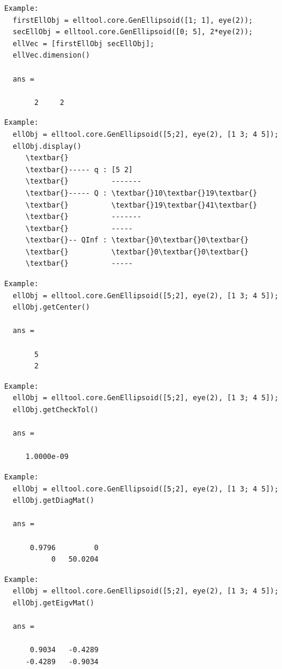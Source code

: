 \documentclass[letterpaper,10pt,english]{sphinxmanual}
\begin{document}
\begin{Verbatim}[commandchars=\\\{\}]
Example:
  firstEllObj = elltool.core.GenEllipsoid([1; 1], eye(2));
  secEllObj = elltool.core.GenEllipsoid([0; 5], 2*eye(2));
  ellVec = [firstEllObj secEllObj];
  ellVec.dimension()

  ans =

       2     2
\end{Verbatim}

\begin{Verbatim}[commandchars=\\\{\}]
Example:
  ellObj = elltool.core.GenEllipsoid([5;2], eye(2), [1 3; 4 5]);
  ellObj.display()
     \textbar{}
     \textbar{}----- q : [5 2]
     \textbar{}          -------
     \textbar{}----- Q : \textbar{}10\textbar{}19\textbar{}
     \textbar{}          \textbar{}19\textbar{}41\textbar{}
     \textbar{}          -------
     \textbar{}          -----
     \textbar{}-- QInf : \textbar{}0\textbar{}0\textbar{}
     \textbar{}          \textbar{}0\textbar{}0\textbar{}
     \textbar{}          -----
\end{Verbatim}

\begin{Verbatim}[commandchars=\\\{\}]
Example:
  ellObj = elltool.core.GenEllipsoid([5;2], eye(2), [1 3; 4 5]);
  ellObj.getCenter()

  ans =

       5
       2
\end{Verbatim}

\begin{Verbatim}[commandchars=\\\{\}]
Example:
  ellObj = elltool.core.GenEllipsoid([5;2], eye(2), [1 3; 4 5]);
  ellObj.getCheckTol()

  ans =

     1.0000e-09
\end{Verbatim}

\begin{Verbatim}[commandchars=\\\{\}]
Example:
  ellObj = elltool.core.GenEllipsoid([5;2], eye(2), [1 3; 4 5]);
  ellObj.getDiagMat()

  ans =

      0.9796         0
           0   50.0204
\end{Verbatim}

\begin{Verbatim}[commandchars=\\\{\}]
Example:
  ellObj = elltool.core.GenEllipsoid([5;2], eye(2), [1 3; 4 5]);
  ellObj.getEigvMat()

  ans =

      0.9034   -0.4289
     -0.4289   -0.9034
\end{Verbatim}
\end{document}
